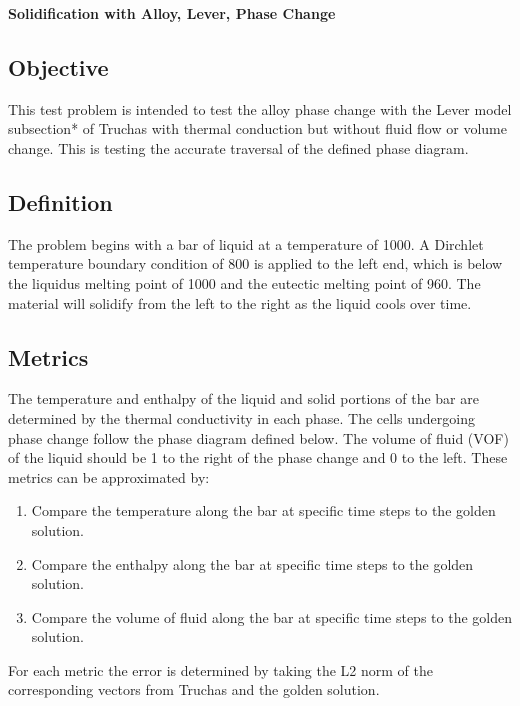 \documentclass[12pt]{article}
\begin{document}
\begin{center}
{\large {\bf Solidification with Alloy, Lever, Phase Change}}
\end{center}

\subsection*{Objective}

This test problem is intended to test the alloy phase change with the Lever model subsection* of Truchas with thermal conduction but without fluid flow or volume change.  This is testing the accurate traversal of the defined phase diagram.

\subsection*{Definition}

The problem begins with a bar of liquid at a temperature of 1000.  A Dirchlet temperature boundary condition of 800 is applied to the left end, which is below the liquidus melting point of 1000 and the eutectic melting point of 960.  The material will solidify from the left to the right as the liquid cools over time.

\subsection*{Metrics}

The temperature and enthalpy of the liquid and solid portions of the bar are determined by the thermal conductivity in each phase.  The cells undergoing phase change follow the phase diagram defined below.  The volume of fluid (VOF) of the liquid should be 1 to the right of the phase change and 0 to the left.  These metrics can be approximated by:

\begin{enumerate}
\item Compare the temperature along the bar at specific time steps to the golden solution.
\item Compare the enthalpy along the bar at specific time steps to the golden solution.
\item Compare the volume of fluid along the bar at specific time steps to the golden solution.
\end{enumerate}

For each metric the error is determined by taking the L2 norm of the corresponding vectors from Truchas and the golden solution.
\end{document}
